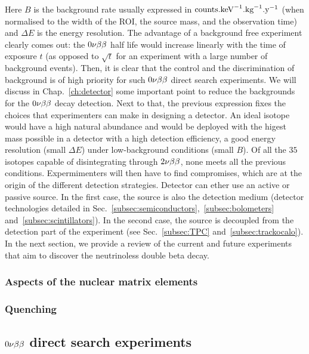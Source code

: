 Here $B$ is the background rate usually expressed in $\text{counts.keV}^{-1}\text{.kg}^{-1}\text{.y}^{-1}$ (when normalised to the width of the ROI, the source mass, and the observation time) and $\Delta E$ is the energy resolution.
The advantage of a background free experiment clearly comes out: the $0\nu\beta\beta$ half life would increase linearly with the time of exposure $t$ (as opposed to $\sqrt t$ for an experiment with a large number of background events).
Then, it is clear that the control and the discrimination of background is of high priority for such $0\nu\beta\beta$ direct search experiments.
We will discuss in Chap.~\ref{ch:detector} some important point to reduce the backgrounds for the $0\nu\beta\beta$ decay detection.
Next to that, the previous expression fixes the choices that experimenters can make in designing a detector.
An ideal isotope would have a high natural abundance and would be deployed with the higest mass possible in a detector with a high detection efficiency, a good energy resolution (small $\Delta E$) under low-background conditions (small $B$).
Of all the $35$ isotopes capable of disintegrating through $2\nu\beta\beta$, none meets all the previous conditions.
Expermimenters will then have to find compromises, which are at the origin of the different detection strategies.
Detector can ether use an active or passive source.
In the first case, the source is also the detection medium (detector technologies detailed in Sec.~\ref{subsec:semiconductors},~\ref{subsec:bolometers} and~\ref{subsec:scintillators}).
In the second case, the source is decoupled from the detection part of the experiment (see Sec.~\ref{subsec:TPC} and~\ref{subsec:trackocalo}).
In the next section, we provide a review of the current and future experiments that aim to discover the neutrinoless double beta decay.

\subsubsection{Aspects of the nuclear matrix elements}
\label{subsec:matrix_element}
\subsubsection{Quenching}
\label{subsec:quenching}

\subsection{$0\nu\beta\beta$ direct search experiments}
\label{sec:zeronuexp}
